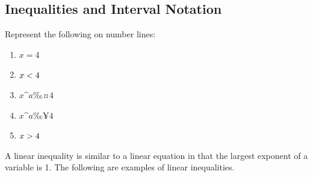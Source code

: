             \subsection{Inequalities and Interval Notation}
            \nopagebreak
      \label{m39254*id157128}Represent the following
on number lines:\par 
      \label{m39254*id157134}\begin{enumerate}[noitemsep, label=\textbf{\arabic*}. ] 
            \label{m39254*uid77}\item 
          $x=4$
        \label{m39254*uid78}\item 
          $x<{}4$
        \label{m39254*uid79}\item 
          $x\^{a}‰¤4$
        \label{m39254*uid80}\item 
          $x\^{a}‰¥4$
        \label{m39254*uid81}\item 
          $x>{}4$
        \end{enumerate}
      \label{m39254*id157267}A linear inequality is similar to a linear equation in that the largest exponent of a variable is 1. The following are examples of linear inequalities.\par 
      \label{m39254*id157271}\nopagebreak\noindent{}

